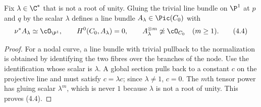 \begin{lemma}
\label{lem:gluing-bundle}
Fix $\lambda\in\C^*$ that is not a root of unity.  Gluing the trivial line
bundle on $\P^1$ at $p$ and $q$ by the scalar $\lambda$ defines a line bundle
\(A_\lambda\in\Pic(C_0)\) with
\[
 \nu^*A_\lambda\simeq\cO_{\P^1},\qquad
 H^0(C_0,A_\lambda)=0,\qquad
 A_\lambda^{\otimes m}\not\simeq\cO_{C_0}\quad(m\ge1).
 \tag{4.4}
\]
\end{lemma}

\begin{proof}
For a nodal curve, a line bundle with trivial pullback to the normalization
is obtained by identifying the two fibres over the branches of the node.
Use the identification whose scalar is $\lambda$.  A global section pulls
back to a constant $c$ on the projective line and must satisfy
$c=\lambda c$; since $\lambda\ne1$, $c=0$.  The $m$th tensor power has
gluing scalar $\lambda^m$, which is never $1$ because $\lambda$ is not a
root of unity.  This proves (4.4).
\end{proof}

